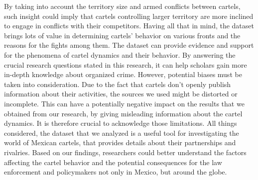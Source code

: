 \documentclass[
]{article}
\begin{document}
By taking into account the territory size and armed conflicts between
cartels, such insight could imply that cartels controlling larger
territory are more inclined to engage in conflicts with their
competitors. Having all that in mind, the dataset brings lots of value
in determining cartels' behavior on various fronts and the reasons for
the fights among them. The dataset can provide evidence and support for
the phenomena of cartel dynamics and their behavior. By answering the
crucial research questions stated in this research, it can help scholars
gain more in-depth knowledge about organized crime. However, potential
biases must be taken into consideration. Due to the fact that cartels
don't openly publish information about their activities, the sources we
used might be distorted or incomplete. This can have a potentially
negative impact on the results that we obtained from our research, by
giving misleading information about the cartel dynamics. It is therefore
crucial to acknowledge those limitations. All things considered, the
dataset that we analyzed is a useful tool for investigating the world of
Mexican cartels, that provides details about their partnerships and
rivalries. Based on our findings, researchers could better understand
the factors affecting the cartel behavior and the potential consequences
for the law enforcement and policymakers not only in Mexico, but around
the globe.
\end{document}
